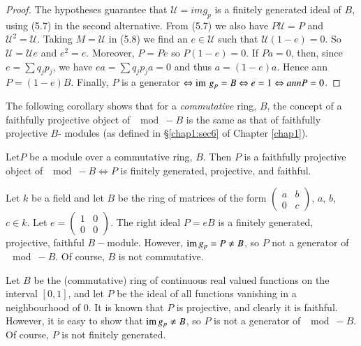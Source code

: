\begin{proof}
The hypotheses guarantee that $\mathscr{U} = im g_p$ is a finitely
generated ideal of $B$, using (5.7) in the second alternative. From
(5.7) we also have $P \mathscr{U} = P$ and $\mathscr{U}^2 =
\mathscr{U}$. Taking $M = \mathscr{U}$ in (5.8) we find an $e \in
\mathscr{U}$ such that $\mathscr{U} (1 - e) = 0$. So $\mathscr{U} =
\mathscr{U} e$ and $e^2 = e$. Moreover, $P = Pe$ so $ P(1 - e)=0$. If
$Pa = 0$, then, since $e = \sum q_j p_j$, we have $ea = \sum q_j p_j a
= 0$ and thus $a = (1 - e)a$. Hence ann $P = (1 - e)B$. Finally, $P$
is a generator $\Leftrightarrow \operatorname{im} \, g_p = B \Leftrightarrow e = 1
\Leftrightarrow ann P =  0$.  
\end{proof}

The following corollary shows that for a \textit{commutative} ring,
$B$, the concept of a faithfully projective object of $\mod - B$ is
the same as that of faithfully projective $B$- modules (as defined in
\S \ref{chap1:sec6} of Chapter \ref{chap1}).  

\setcounter{coro}{9}
\begin{coro}\label{chap2:coro5.10}%
Let\pageoriginale $P$ be a module over a commutative ring, $B$. Then
$P$ is a faithfully projective object of $\mod - B \Leftrightarrow P$
is finitely generated, projective, and faithful.  
\end{coro}

\begin{exam}%
Let $k$ be a field and let $B$ be the ring of matrices of the form
$\left( \begin{smallmatrix}  a & b \\ 0 & c \end{smallmatrix}\right)$,
$a$, $b$, $c \in k$. Let $e =\left(  \begin{smallmatrix} 1 & 0 \\ 0
  & 0\end{smallmatrix} \right)$. The right ideal $P = eB$ is a
  finitely generated, projective, faithful $B-$module. However, $\operatorname{im}
  g_p = P \neq B$, so $P$ not a generator of $\mod - B$. Of course, $B$
  is not commutative.  
\end{exam}

\begin{exam}[Kaplansky]%
Let $B$ be the (commutative) ring of continuous
real valued functions on the interval $[ 0, 1]$, and let $P$ be the
ideal of all functions vanishing in a neighbourhood of 0. It is
known that $P$ is projective, and clearly it is faithful. However, it
is easy to show that $\operatorname{im} g_p \neq B$, so $P$ is not a generator of
$\mod - B$. Of course, $P$ is not finitely generated.   
\end{exam}


